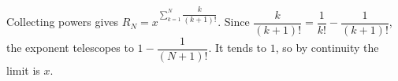 Collecting powers gives $R_N=x^{\sum_{k=1}^N \dfrac{k}{(k+1)!}}$. Since $\dfrac{k}{(k+1)!}=\dfrac{1}{k!}-\dfrac{1}{(k+1)!}$, the exponent telescopes to $1-\dfrac{1}{(N+1)!}$. It tends to $1$, so by continuity the limit is $\boxed{x}$.
